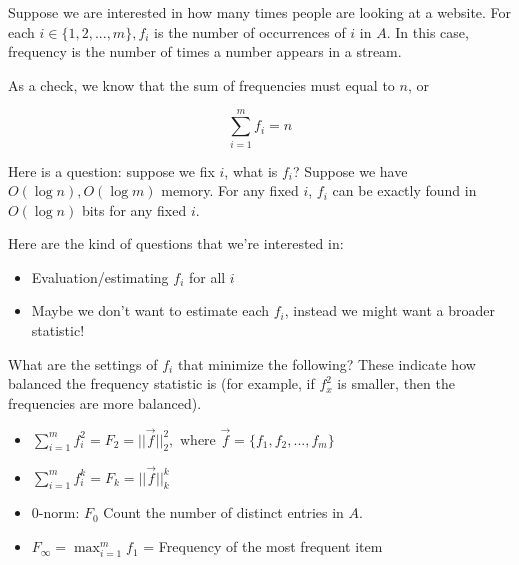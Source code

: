 \documentclass[11pt]{article}
\begin{document}
Suppose we are interested in how many times people are looking at a website. For each $i \in \{1, 2, ..., m\}, f_i$ is the number of occurrences of $i$ in $A$. In this case, frequency is the number of times a number appears in a stream. 

\smallskip

As a check, we know that the sum of frequencies must equal to $n$, or

\[ \sum_{i = 1}^m f_i = n \]

\smallskip

Here is a question: suppose we fix $i$, what is $f_i$? Suppose we have $O(\log n), O(\log m)$ memory. For any fixed $i$, $f_i$ can be exactly found in $O(\log n)$ bits for any fixed $i$. 


\smallskip

Here are the kind of questions that we're interested in:

\begin{itemize}

	\item Evaluation/estimating $f_i$ for all $i$
	
	\item Maybe we don't want to estimate each $f_i$, instead we might want a broader statistic!

\end{itemize}

\smallskip

What are the settings of $f_i$ that minimize the following? These indicate how balanced the frequency statistic is (for example, if $f_x^2$ is smaller, then the frequencies are more balanced). 

\begin{itemize}

	\item $\sum_{i = 1}^m f_i^2 = F_2 = || \vec{f}||_2^2, \text{ where } \vec{f} = \{f_1, f_2, ..., f_m\}$

	\item $\sum_{i = 1}^m f_i^k = F_k = || \vec{f}||_k^k$

	\item 0-norm: $F_0$ Count the number of distinct entries in $A$.
	
	\item $F_\infty = \max_{i = 1}^m f_1$ = Frequency of the most frequent item

\end{itemize}
\end{document}
